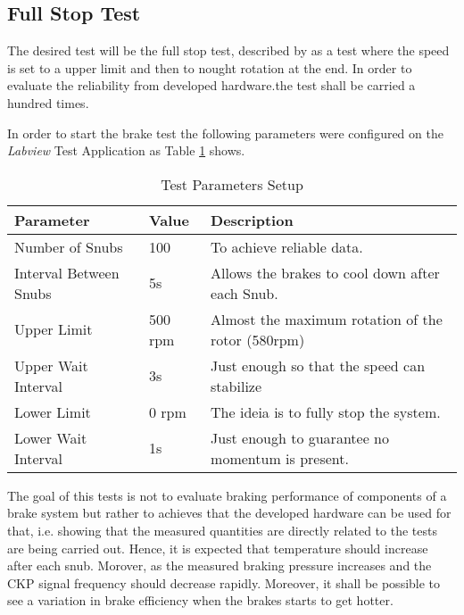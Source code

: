 \subsection{Full Stop Test}\label{ssec:full-stop-test}

		The desired test will be the full stop test, described by \cite{caixeta2017} as a test where the speed is set to a upper limit and then to nought rotation at the end. In order to evaluate the reliability from developed hardware.the test shall be carried a hundred times.

		\par
		In order to start the brake test the following parameters were configured on the \textit{Labview} Test Application as Table \ref{table:brake-test-parameters} shows.

		\begin{table}[h!]
			\begin{tabular}{|l|l|l|}
				\hline
				\textbf{Parameter} & \textbf{Value} & \textbf{Description} \\ \hline
				Number of Snubs & 100 & To achieve reliable data. \\ \hline
				Interval Between Snubs & 5s & Allows the brakes to cool down after each Snub. \\ \hline
				Upper Limit & 500 rpm & Almost the maximum rotation of the rotor (580rpm) \\ \hline
				Upper Wait Interval & 3s & Just enough so that the speed can stabilize \\ \hline
				Lower Limit & 0 rpm & The ideia is to fully stop the system. \\ \hline
				Lower Wait Interval & 1s & Just enough to guarantee no momentum is present. \\ \hline
			\end{tabular}
			\caption{Test Parameters Setup}
			\label{table:brake-test-parameters}
		\end{table}

		The goal of this tests is not to evaluate braking performance of components of a brake system but rather to achieves that the developed hardware can be used for that, i.e. showing that the measured quantities are directly related to the tests are being carried out. Hence, it is expected that temperature should increase after each snub. Morover, as the measured braking pressure increases and the CKP signal frequency should decrease rapidly. Moreover, it shall be possible to see a variation in brake efficiency when the brakes starts to get hotter.